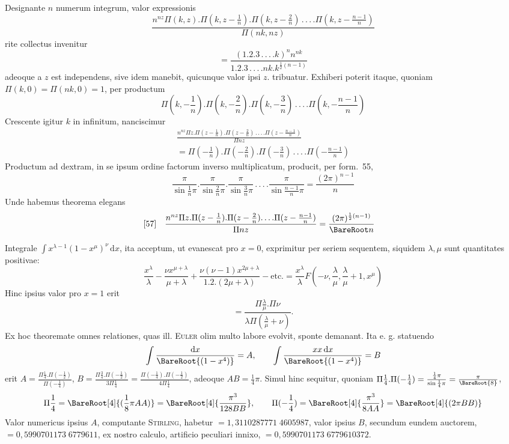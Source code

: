 Designante $n$ numerum integrum, valor expressionis
\[
\frac{n^{nz}\Pi(k,z).\Pi(k,z-\frac1n).\Pi(k,z-\frac2n)
\,.\,.\,.\,.\Pi(k,z-\frac{n-1}{n})}{\Pi(nk,nz)}
\]
rite collectus invenitur
\[
=\frac{(1.2.3\,.\,.\,.\,.k)^n n^{nk}}
{1.2.3\,.\,.\,.\,.nk.k^{\frac12(n-1)}}
\]
adeoque a $z$ est independens, sive idem manebit, quicunque valor ipsi
$z$. tribuatur. Exhiberi poterit itaque, quoniam $\Pi(k,0)=\Pi(nk,0)=1$,
per productum
\[
\Pi(k,-\frac1n).\Pi(k,-\frac2n).\Pi(k,-\frac3n)
\,.\,.\,.\,.\Pi(k,-\frac{n-1}{n})
\]
Crescente igitur $k$ in infinitum, nanciscimur
\[
\begin{gathered}
\frac{n^{nz}\Pi z.\Pi(z-\frac1n).\Pi(z-\frac2n)
\,.\,.\,.\,.\Pi(z-\frac{n-1}{n})}{\Pi nz}\\[4pt]
=\Pi(-\frac1n).\Pi(-\frac2n).\Pi(-\frac3n)
\,.\,.\,.\,.\Pi(-\frac{n-1}{n})
\end{gathered}
\]
Productum ad dextram, in se ipsum ordine factorum inverso multiplicatum,
producit, per form.\ 55,
\[
\frac{\pi}{\sin\frac1n\pi}.\frac{\pi}{\sin\frac2n\pi}.
\frac{\pi}{\sin\frac3n\pi}\,.\,.\,.\,.
\frac{\pi}{\sin\frac{n-1}{n}\pi}=\frac{(2\pi)^{n-1}}{n}
\]
Unde habemus theorema elegans
\[
\begin{aligned}
{}\text{[57]}\quad &
\frac{n^{nz}\Pi z.\Pi(z-\frac1n).\Pi(z-\frac2n).\,.\,.\,.
\Pi(z-\frac{n-1}{n})}{\Pi nz}
=\frac{(2\pi)^{\frac12(n-1)}}{\BareRoot n}
\end{aligned}
\]

Integrale $\int x^{\lambda-1}(1-x^\mu)^\nu\,\mathrm{d}x$,
ita acceptum, ut evanescat pro $x=0$, exprimitur per seriem
sequentem, siquidem $\lambda,\mu$ sunt quantitates positivae:
\[
\frac{x^\lambda}{\lambda}
-\frac{\nu x^{\mu+\lambda}}{\mu+\lambda}
+\frac{\nu(\nu-1)x^{2\mu+\lambda}}{1.2.(2\mu+\lambda)}
-\mathrm{etc.}
=\frac{x^\lambda}{\lambda}F(-\nu,\frac\lambda\mu,
\frac\lambda\mu+1,x^\mu)
\]
Hinc ipsius valor pro $x=1$ erit
\[
=\frac{\Pi\frac\lambda\mu.\Pi\nu}
{\lambda\Pi(\frac\lambda\mu+\nu)}.
\]
Ex hoc theoremate omnes relationes, quas ill. \textsc{Euler} olim
multo labore evolvit, sponte demanant. Ita e. g. statuendo
\[
\int\frac{\mathrm{d}x}{\BareRoot{(1-x^4)}}=A,\qquad
\int\frac{xx\,\mathrm{d}x}{\BareRoot{(1-x^4)}}=B
\]
erit $A=\frac{\Pi\frac14.\Pi(-\frac12)}{\Pi(-\frac14)}$,
$B=\frac{\Pi\frac34.\Pi(-\frac12)}{3\Pi\frac14}
=\frac{\Pi(-\frac14).\Pi(-\frac12)}{4\Pi\frac14}$,
adeoque $AB=\frac14\pi$. Simul hinc sequitur, quoniam
$\Pi\frac14.\Pi(-\frac14)=\frac{\frac14\pi}{\sin\frac14\pi}
=\frac\pi{\BareRoot{8}}$,
\[
\Pi\frac14=\BareRoot[4]{(\frac18\pi AA)}
=\BareRoot[4]{\frac{\pi^3}{128BB}},\qquad
\Pi(-\frac14)=\BareRoot[4]{\frac{\pi^3}{8AA}}
=\BareRoot[4]{(2\pi BB)}
\]
Valor numericus ipsius $A$, computante \textsc{Stirling}, habetur
$=1{,}3110287771\;\allowbreak 4605987$, valor ipsius $B$, secundum eundem
auctorem, $=0{,}5990701173\;\allowbreak 6779611$, ex nostro calculo,
artificio peculiari innixo, $=0{,}5990701173\;\allowbreak 6779610372$.

